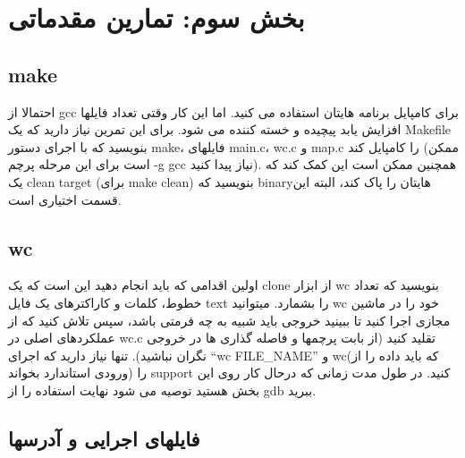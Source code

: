 \newpage
\section
{
\textbf{ {\Large 
بخش سوم: تمارین مقدماتی
}}}

\subsection{make}
احتمالا از gcc برای کامپایل برنامه هایتان استفاده می کنید. اما این کار وقتی تعداد فایلها افزایش یابد پیچیده و خسته کننده می شود. برای این تمرین نیاز دارید که یک Makefile بنویسید که با اجرای دستور make، فایلهای main.c، wc.c و map.c را کامپایل کند (ممکن است برای این مرحله پرچم -g gcc نیاز پیدا کنید). همچنین ممکن است این کمک کند که یک clean target (برای make clean) بنویسید که binaryهایتان را پاک کند، البته این قسمت اختیاری است.

\subsection{wc}
اولین اقدامی که باید انجام دهید این است که یک clone از ابزار wc بنویسید که تعداد خطوط، کلمات و کاراکترهای یک فایل text را بشمارد. میتوانید wc خود را در ماشین مجازی اجرا کنید تا ببینید خروجی باید شبیه به چه فرمتی باشد، سپس تلاش کنید که از عملکردهای اصلی در wc.c تقلید کنید (از بابت پرچمها و فاصله گذاری ها در خروجی نگران نباشید).
تنها نیاز دارید که اجرای “wc FILE_NAME” و wc(که باید داده را از ورودی استاندارد بخواند) را support کنید.
در طول مدت زمانی که درحال کار روی این بخش هستید توصیه می شود نهایت استفاده را از gdb ببرید.

\subsection{فایلهای اجرایی و آدرسها}

